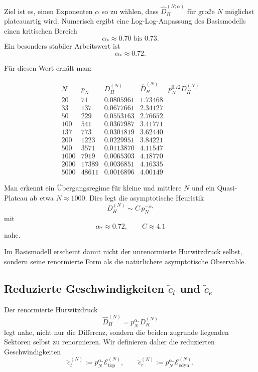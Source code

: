 \documentclass[12pt,a4paper]{article}
\theoremstyle{definition}
\begin{document}
	Ziel ist es, einen Exponenten \(\alpha\) so zu wählen, dass \(\widehat D_H^{(N;\alpha)}\) für große \(N\) möglichst plateauartig wird. Numerisch ergibt eine Log-Log-Anpassung des Basismodells einen kritischen Bereich
	\[
	\alpha_\ast \approx 0.70\text{ bis }0.73.
	\]
	Ein besonders stabiler Arbeitswert ist
	\[
	\alpha_\ast \approx 0.72.
	\]
	
	Für diesen Wert erhält man:
	
	\[
	\begin{array}{r|r|r|r}
		N & p_N & D_H^{(N)} & \widehat D_H^{(N)}=p_N^{0.72}D_H^{(N)}\\
		\hline
		20   & 71    & 0.0805961 & 1.73468\\
		33   & 137   & 0.0677661 & 2.34127\\
		50   & 229   & 0.0553163 & 2.76652\\
		100  & 541   & 0.0367987 & 3.41771\\
		137  & 773   & 0.0301819 & 3.62440\\
		200  & 1223  & 0.0229951 & 3.84221\\
		500  & 3571  & 0.0113870 & 4.11547\\
		1000 & 7919  & 0.0065303 & 4.18770\\
		2000 & 17389 & 0.0036851 & 4.16335\\
		5000 & 48611 & 0.0016896 & 4.00149
	\end{array}
	\]
	
	Man erkennt ein Übergangsregime für kleine und mittlere \(N\) und ein Quasi-Plateau ab etwa \(N\approx 1000\). Dies legt die asymptotische Heuristik
	\[
	D_H^{(N)}\sim C\,p_N^{-\alpha_\ast}
	\]
	mit
	\[
	\alpha_\ast\approx 0.72,
	\qquad
	C\approx 4.1
	\]
	nahe.
	
	Im Basismodell erscheint damit nicht der unrenormierte Hurwitzdruck selbst, sondern seine renormierte Form als die natürlichere asymptotische Observable.
	
	\subsection{Reduzierte Geschwindigkeiten \( \tilde c_t \) und \( \tilde c_e \)}
	
	Der renormierte Hurwitzdruck
	\[
	\widehat D_H^{(N)}=p_N^{\alpha_\ast}D_H^{(N)}
	\]
	legt nahe, nicht nur die Differenz, sondern die beiden zugrunde liegenden Sektoren selbst zu renormieren. Wir definieren daher die reduzierten Geschwindigkeiten
	\[
	\tilde c_t^{(N)} := p_N^{\alpha_\ast}\mathcal E_{\mathrm{top}}^{(N)},
	\qquad
	\tilde c_e^{(N)} := p_N^{\alpha_\ast}\mathcal E_{\mathrm{edyn}}^{(N)}.
	\]
	
\end{document}
